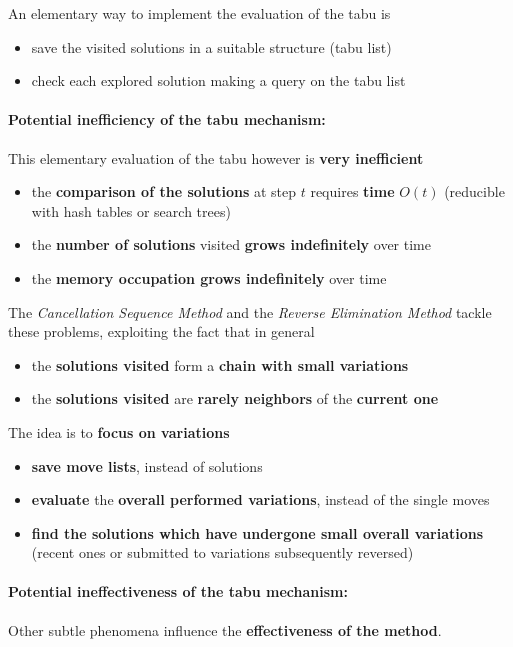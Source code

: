 \documentclass[11pt]{article}
\begin{document}
	An elementary way to implement the evaluation of the tabu is
	\begin{itemize}
		\item save the visited solutions in a suitable structure (tabu list)
		\item check each explored solution making a query on the tabu list
	\end{itemize}
	
	\newpage
	
	\paragraph{Potential inefficiency of the tabu mechanism:} This elementary evaluation of the tabu however is \textbf{very inefficient}
	\begin{itemize}
		\item the \textbf{comparison of the solutions} at step $t$ requires \textbf{time} $O (t)$ (reducible with hash tables or search trees)
		\item the \textbf{number of solutions} visited \textbf{grows indefinitely} over time
		\item the \textbf{memory occupation grows indefinitely} over time
	\end{itemize}
	
	The \textit{Cancellation Sequence Method} and the \textit{Reverse Elimination Method} tackle these problems, exploiting the fact that in general
	\begin{itemize}
		\item the \textbf{solutions visited} form a \textbf{chain with small variations}
		\item the \textbf{solutions visited} are \textbf{rarely neighbors} of the \textbf{current one}
	\end{itemize}
	
	The idea is to \textbf{focus on variations}
	\begin{itemize}
		\item \textbf{save move lists}, instead of solutions
		\item \textbf{evaluate} the \textbf{overall performed variations}, instead of the single moves
		\item \textbf{find the solutions which have undergone small overall variations} (recent ones or submitted to variations subsequently reversed)
	\end{itemize}
	
	\vfill
	
	\paragraph{Potential ineffectiveness of the tabu mechanism:} Other subtle phenomena influence the \textbf{effectiveness of the method}.\\
	
\end{document}
